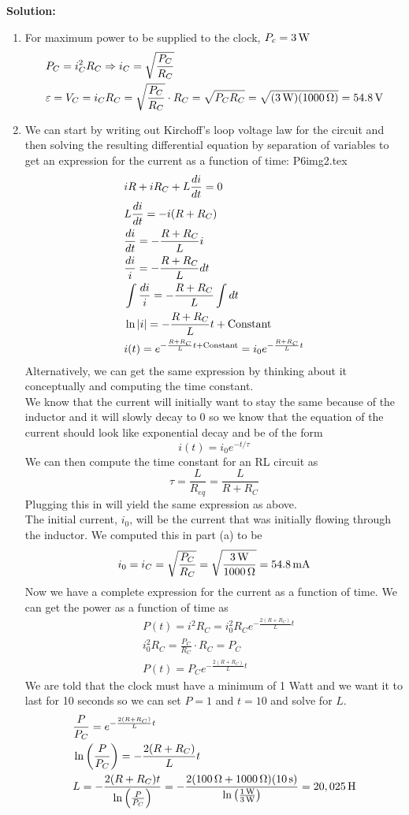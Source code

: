 \textbf{Solution:}
\begin{enumerate}
\item For maximum power to be supplied to the clock, $P_c=3\units{W}$
\begin{align*}
    &P_C=i_C^2R_C\Ra i_C=\sqrt{\frac{P_C}{R_C}}\\
    &\varepsilon=V_C=i_CR_C=\sqrt{\frac{P_C}{R_C}}\cdot R_C=\sqrt{P_CR_C}=\sqrt{(3\units{W})(1000\units{\Omega})}=54.8\units{V}
\end{align*}
\item We can start by writing out Kirchoff's loop voltage law for the circuit and then solving the resulting differential equation by separation of variables to get an expression for the current as a function of time:
{P6img2.tex}
\begin{align*}
    &iR+iR_C+L\ddx[i]{t}=0\\
    &L\ddx[i]{t}=-i(R+R_C)\\
    &\ddx[i]{t}=-\frac{R+R_C}{L}i\\
    &\frac{di}{i}=-\frac{R+R_C}{L}dt\\
    &\int\frac{di}{i}=-\frac{R+R_C}{L}\int dt\\
    &\ln|i|=-\frac{R+R_C}{L}t+\text{Constant}\\
    &i(t)=e^{-\frac{R+R_C}{L}t+\text{Constant}}=i_0e^{-\frac{R+R_C}{L}t}
\end{align*}
Alternatively, we can get the same expression by thinking about it conceptually and computing the time constant.\\
We know that the current will initially want to stay the same because of the inductor and it will slowly decay to 0 so we know that the equation of the current should look like exponential decay and be of the form
\[i(t)=i_0e^{-t/\tau}\]
We can then compute the time constant for an RL circuit as
\[\tau=\frac{L}{R_{eq}}=\frac{L}{R+R_C}\]
Plugging this in will yield the same expression as above.\\
The initial current, $i_0$, will be the current that was initially flowing through the inductor. We computed this in part (a) to be
\[i_0=i_C=\sqrt{\frac{P_C}{R_C}}=\sqrt{\frac{3\units{W}}{1000\units{\Omega}}}=54.8\units{mA}\]
Now we have a complete expression for the current as a function of time. We can get the power as a function of time as
\begin{align*}
    &P(t)=i^2R_C=i_0^2R_Ce^{-\frac{2(R+R_C)}{L}t}\\
    &i_0^2R_C=\frac{P_C}{R_C}\cdot R_C=P_C\\
    &P(t)=P_Ce^{-\frac{2(R+R_C)}{L}t}
\end{align*}
We are told that the clock must have a minimum of 1 Watt and we want it to last for 10 seconds so we can set $P=1$ and $t=10$ and solve for $L$.
\begin{align*}
    &\frac{P}{P_C}=e^{-\frac{2(R+R_C)}{L}t}\\
    &\ln\bfrac{P}{P_C}=-\frac{2(R+R_C)}{L}t\\
    &L=-\frac{2(R+R_C)t}{\ln\bfrac{P}{P_C}}=-\frac{2(100\units{\Omega}+1000\units{\Omega})(10\units{s})}{\ln\bfrac{1\units{W}}{3\units{W}}}=20,025\units{H}
\end{align*}
\end{enumerate}
